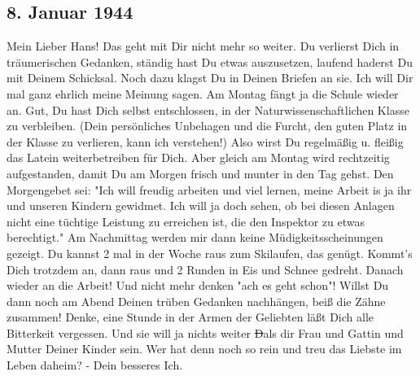 \subsection{8. Januar 1944}

Mein Lieber Hans!
Das geht mit Dir nicht mehr so weiter.
Du verlierst Dich in tr\"{a}umerischen Gedanken, st\"{a}ndig hast Du etwas auszusetzen, laufend haderst Du mit Deinem Schicksal.
Noch dazu klagst Du in Deinen Briefen an sie.
Ich will Dir mal ganz ehrlich meine Meinung sagen.
Am Montag f\"{a}ngt ja die Schule wieder an.
Gut, Du hast Dich selbst entschlossen, in der Naturwissenschaftlichen Klasse zu verbleiben.
(Dein pers\"{o}nliches Unbehagen und die Furcht, den guten Platz in der Klasse zu verlieren, kann ich verstehen!)
Also wirst Du regelm\"{a}{\ss}ig u. flei{\ss}ig das Latein weiterbetreiben f\"{u}r Dich.
Aber gleich am Montag wird rechtzeitig aufgestanden, damit Du am Morgen frisch und munter in den Tag gehst.
Den Morgengebet sei: "Ich will freudig arbeiten und viel lernen, meine Arbeit is ja ihr und unseren Kindern gewidmet.
Ich will ja doch sehen, ob bei diesen Anlagen nicht eine t\"{u}chtige Leistung zu erreichen ist, die den Inspektor zu etwas berechtigt."
Am Nachmittag werden mir dann keine M\"{u}digkeitsscheinungen gezeigt.
Du kannst 2 mal in der Woche raus zum Skilaufen, das gen\"{u}gt.
Kommt's Dich trotzdem an, dann raus und 2 Runden in Eis und Schnee gedreht.
Danach wieder an die Arbeit!
Und nicht mehr denken "ach es geht schon"!
Willst Du dann noch am Abend Deinen tr\"{u}ben Gedanken nachh\"{a}ngen, bei{\ss} die Z\"{a}hne zusammen!
Denke, eine Stunde in der Armen der Geliebten l\"{a}{\ss}t Dich alle Bitterkeit vergessen.
Und sie will ja nichts weiter \st{D}als dir Frau und Gattin und Mutter Deiner Kinder sein.
Wer hat denn noch so rein und treu das Liebste im Leben daheim?
- Dein besseres Ich.

\clearpage
